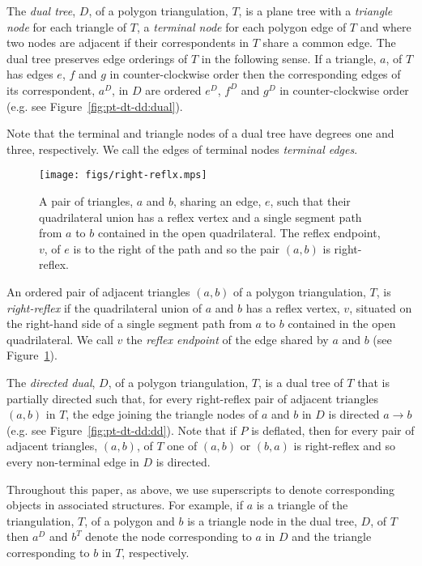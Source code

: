 \documentclass{patmorin}
\begin{document}
The \emph{dual tree}, $D$, of a polygon triangulation, $T$, is a plane
tree with a \emph{triangle node} for each triangle of $T$, a
\emph{terminal node} for each polygon edge of $T$ and where two nodes
are adjacent if their correspondents in $T$ share a common edge.  The
dual tree preserves edge orderings of $T$ in the following sense.  If
a triangle, $a$, of $T$ has edges $e$, $f$ and $g$ in
counter-clockwise order then the corresponding edges of its
correspondent, $a^D$, in $D$ are ordered $e^D$, $f^D$ and $g^D$ in
counter-clockwise order (e.g. see Figure~\ref{fig:pt-dt-dd:dual}).

Note that the terminal and triangle nodes of a dual tree have degrees
one and three, respectively.  We call the edges of terminal nodes
\emph{terminal edges}.


\begin{figure}[htb]
  \centering
  \texttt{[image: figs/right-reflx.mps]}
  \caption{A pair of triangles, $a$ and $b$, sharing an edge, $e$,
    such that their quadrilateral union has a reflex vertex and a
    single segment path from $a$ to $b$ contained in the open
    quadrilateral.  The reflex endpoint, $v$, of $e$ is to the right
    of the path and so the pair $(a,b)$ is right-reflex.}
  \label{fig:rrefl}
\end{figure}

An ordered pair of adjacent triangles $(a,b)$ of a polygon
triangulation, $T$, is \emph{right-reflex} if the quadrilateral union
of $a$ and $b$ has a reflex vertex, $v$, situated on the right-hand
side of a single segment path from $a$ to $b$ contained in the open
quadrilateral.  We call $v$ the \emph{reflex endpoint} of the edge
shared by $a$ and $b$ (see Figure~\ref{fig:rrefl}).

The \emph{directed dual}, $D$, of a polygon triangulation, $T$, is a
dual tree of $T$ that is partially directed such that, for every
right-reflex pair of adjacent triangles $(a, b)$ in $T$, the edge
joining the triangle nodes of $a$ and $b$ in $D$ is directed
$a\rightarrow b$ (e.g. see Figure~\ref{fig:pt-dt-dd:dd}).  Note that
if $P$ is deflated, then for every pair of adjacent triangles, $(a,
b)$, of $T$ one of $(a, b)$ or $(b, a)$ is right-reflex and so every
non-terminal edge in $D$ is directed.

Throughout this paper, as above, we use superscripts to denote
corresponding objects in associated structures.  For example, if $a$
is a triangle of the triangulation, $T$, of a polygon and $b$ is a
triangle node in the dual tree, $D$, of $T$ then $a^D$ and $b^T$
denote the node corresponding to $a$ in $D$ and the triangle
corresponding to $b$ in $T$, respectively.
\end{document}
